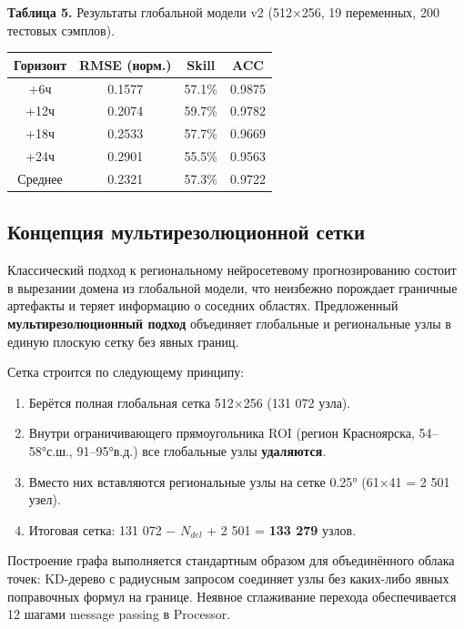 \documentclass[14pt,a4paper]{extarticle}
\newcounter{none}
\numberwithin{table}{section}
\numberwithin{figure}{section}
\numberwithin{equation}{section}
\providecommand{\tightlist}{%
  \setlength{\itemsep}{0pt}\setlength{\parskip}{0pt}}
\begin{document}
\textbf{Таблица 5.} Результаты глобальной модели v2 (512×256, 19
переменных, 200 тестовых сэмплов).

{\def\LTcaptype{none} %
\begin{longtable}[]{@{}cccc@{}}
\toprule\noalign{}
Горизонт & RMSE (норм.) & Skill & ACC \\
\midrule\noalign{}
\endhead
\bottomrule\noalign{}
\endlastfoot
+6ч & 0.1577 & 57.1\% & 0.9875 \\
+12ч & 0.2074 & 59.7\% & 0.9782 \\
+18ч & 0.2533 & 57.7\% & 0.9669 \\
+24ч & 0.2901 & 55.5\% & 0.9563 \\
Среднее & 0.2321 & 57.3\% & 0.9722 \\
\end{longtable}
}

\subsection{Концепция мультирезолюционной сетки}\label{ux43aux43eux43dux446ux435ux43fux446ux438ux44f-ux43cux443ux43bux44cux442ux438ux440ux435ux437ux43eux43bux44eux446ux438ux43eux43dux43dux43eux439-ux441ux435ux442ux43aux438}

Классический подход к региональному нейросетевому прогнозированию
состоит в вырезании домена из глобальной модели, что неизбежно порождает
граничные артефакты и теряет информацию о соседних областях.
Предложенный \textbf{мультирезолюционный подход} объединяет глобальные и
региональные узлы в единую плоскую сетку без явных границ.

Сетка строится по следующему принципу:

\begin{enumerate}
\def\labelenumi{\arabic{enumi}.}
\tightlist
\item
  Берётся полная глобальная сетка 512×256 (131 072 узла).
\item
  Внутри ограничивающего прямоугольника ROI (регион Красноярска,
  54--58°с.ш., 91--95°в.д.) все глобальные узлы \textbf{удаляются}.
\item
  Вместо них вставляются региональные узлы на сетке 0.25° (61×41 = 2 501
  узел).
\item
  Итоговая сетка: 131 072 − \(N_{del}\) + 2 501 = \textbf{133 279}
  узлов.
\end{enumerate}

Построение графа выполняется стандартным образом для объединённого
облака точек: KD-дерево с радиусным запросом соединяет узлы без
каких-либо явных поправочных формул на границе. Неявное сглаживание
перехода обеспечивается 12 шагами message passing в Processor.
\end{document}
